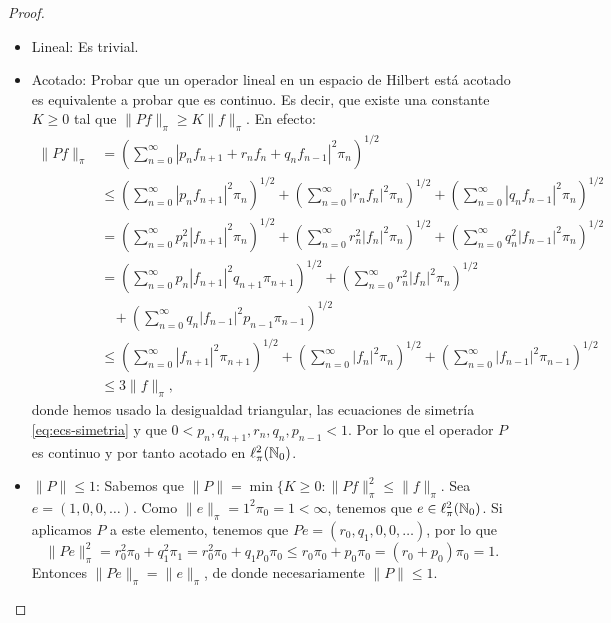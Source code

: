 \begin{proof}
\begin{itemize}
            \item Lineal: Es trivial.
            \item Acotado: Probar que un operador lineal en un espacio de Hilbert está acotado es equivalente a probar que es continuo. Es decir, que existe una constante $K\geq 0$ tal que $\|Pf\|_\pi\geq K\|f\|_\pi$. En efecto:
            \begin{equation*}
                \begin{split}
                    \|Pf\|_\pi &= \left(\sum_{n=0}^\infty |p_n f_{n+1} + r_n f_n + q_n f_{n-1}|^2 \pi_n\right)^{1/2} \\
                    &\leq \left(\sum_{n=0}^\infty |p_n f_{n+1}|^2\pi_n\right)^{1/2} + \left(\sum_{n=0}^\infty |r_n f_{n}|^2\pi_n\right)^{1/2} + \left(\sum_{n=0}^\infty |q_n f_{n-1}|^2\pi_n\right)^{1/2}  \\
                    &= \left(\sum_{n=0}^\infty p_n^2 |f_{n+1}|^2\pi_n\right)^{1/2} + \left(\sum_{n=0}^\infty r_n^2 |f_{n}|^2\pi_n\right)^{1/2} + \left(\sum_{n=0}^\infty q_n^2 |f_{n-1}|^2\pi_n\right)^{1/2}  \\
                    &= \left(\sum_{n=0}^\infty p_n |f_{n+1}|^2q_{n+1}\pi_{n+1}\right)^{1/2} + \left(\sum_{n=0}^\infty r_n^2 |f_{n}|^2\pi_n\right)^{1/2} \\ &\ \ \ \ + \left(\sum_{n=0}^\infty q_n |f_{n-1}|^2p_{n-1}\pi_{n-1}\right)^{1/2} \\
                    &\leq \left(\sum_{n=0}^\infty |f_{n+1}|^2\pi_{n+1}\right)^{1/2} + \left(\sum_{n=0}^\infty |f_{n}|^2\pi_n\right)^{1/2} + \left(\sum_{n=0}^\infty |f_{n-1}|^2\pi_{n-1}\right)^{1/2} \\
                    &\leq 3  \|f\|_\pi,
                \end{split}
            \end{equation*}
            donde hemos usado la desigualdad triangular, las ecuaciones de simetría \eqref{eq:ecs-simetria} y que $0 <p_n,q_{n+1},r_n,q_n,p_{n-1}<1$. Por lo que el operador $P$ es continuo y por tanto acotado en $\ell^2_\pi(\mathbb{N}_0)$.
            \item $\|P\|\leq 1$: Sabemos que $\|P\|= \min\{K\geq 0: \|Pf\|_\pi^2\leq \|f\|_\pi$. Sea $e = (1,0,0,\dots)$. Como $\|e\|_\pi = 1^2 \pi_0 =1<\infty$, tenemos que $e\in\ell^2_\pi(\mathbb{N}_0)$. Si aplicamos $P$ a este elemento, tenemos que $Pe = (r_0, q_1, 0, 0,\dots)$, por lo que
            $$
            \|Pe\|^2_\pi= r_0^2\pi_0 + q_1^2\pi_1 = r_0^2\pi_0 +q_1 p_0 \pi_0 \leq r_0\pi_0 + p_0\pi_0 = (r_0+p_0)\pi_0 = 1.
            $$
            Entonces $\|Pe\|_\pi=\|e\|_\pi$, de donde necesariamente $\|P\|\leq 1$.


\end{itemize}
\end{proof}
